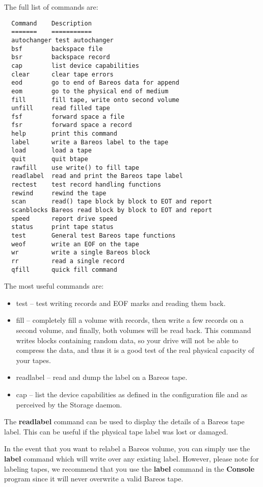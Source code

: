 The full list of commands are:

\footnotesize
\begin{verbatim}
  Command    Description
  =======    ===========
  autochanger test autochanger
  bsf        backspace file
  bsr        backspace record
  cap        list device capabilities
  clear      clear tape errors
  eod        go to end of Bareos data for append
  eom        go to the physical end of medium
  fill       fill tape, write onto second volume
  unfill     read filled tape
  fsf        forward space a file
  fsr        forward space a record
  help       print this command
  label      write a Bareos label to the tape
  load       load a tape
  quit       quit btape
  rawfill    use write() to fill tape
  readlabel  read and print the Bareos tape label
  rectest    test record handling functions
  rewind     rewind the tape
  scan       read() tape block by block to EOT and report
  scanblocks Bareos read block by block to EOT and report
  speed      report drive speed
  status     print tape status
  test       General test Bareos tape functions
  weof       write an EOF on the tape
  wr         write a single Bareos block
  rr         read a single record
  qfill      quick fill command
\end{verbatim}
\normalsize

The most useful commands are:

\begin{itemize}
\item test -- test writing records and EOF marks and  reading them back.
\item fill -- completely fill a volume with records, then  write a few records
   on a second volume, and finally,  both volumes will be read back.
   This command writes blocks containing random data, so your drive will
   not be able to compress the data, and thus it is a good test of
   the real physical capacity of your tapes.
\item readlabel -- read and dump the label on a Bareos tape.
\item cap -- list the device capabilities as defined in the  configuration
   file and as perceived by the Storage daemon.
\end{itemize}

The {\bf readlabel} command can be used to display the details of a Bareos
tape label. This can be useful if the physical tape label was lost or damaged.

In the event that you want to relabel a Bareos volume, you can simply use the
{\bf label} command which will write over any existing label. However, please
note for labeling tapes, we recommend that you use the {\bf label} command in
the {\bf Console} program since it will never overwrite a valid Bareos tape.

